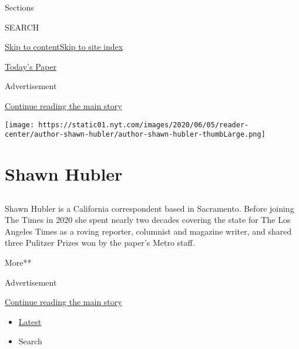 Sections

SEARCH

\protect\hyperlink{site-content}{Skip to
content}\protect\hyperlink{site-index}{Skip to site index}

\href{https://myaccount.nytimes.com/auth/login?response_type=cookie\&client_id=vi}{}

\href{https://www.nytimes.com/section/todayspaper}{Today's Paper}

Advertisement

\protect\hyperlink{after-top}{Continue reading the main story}

\texttt{[image: https://static01.nyt.com/images/2020/06/05/reader-center/author-shawn-hubler/author-shawn-hubler-thumbLarge.png]}

\hypertarget{shawn-hubler}{%
\section{Shawn Hubler}\label{shawn-hubler}}

\subsection{}

Shawn Hubler is a California correspondent based in Sacramento. Before
joining The Times in 2020 she spent nearly two decades covering the
state for The Los Angeles Times as a roving reporter, columnist and
magazine writer, and shared three Pulitzer Prizes won by the paper's
Metro staff.

More**

Advertisement

\protect\hyperlink{after-mid1}{Continue reading the main story}

\begin{itemize}
\tightlist
\item
  \protect\hyperlink{stream-panel}{Latest}
\item
  Search
\end{itemize}

